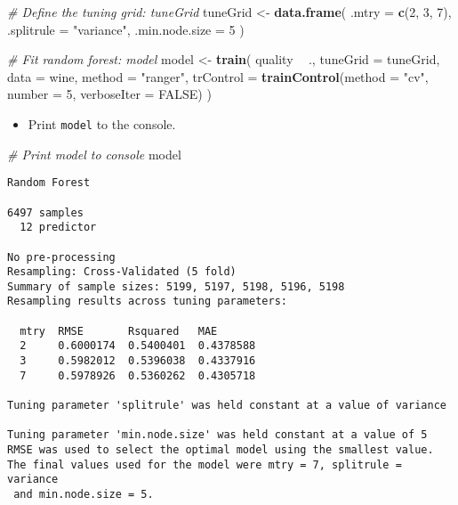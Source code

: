 \documentclass[
]{book}
\newenvironment{Shaded}{\begin{snugshade}}{\end{snugshade}}
\newcommand{\CommentTok}[1]{\textcolor[rgb]{0.56,0.35,0.01}{\textit{#1}}}
\newcommand{\DataTypeTok}[1]{\textcolor[rgb]{0.13,0.29,0.53}{#1}}
\newcommand{\DecValTok}[1]{\textcolor[rgb]{0.00,0.00,0.81}{#1}}
\newcommand{\KeywordTok}[1]{\textcolor[rgb]{0.13,0.29,0.53}{\textbf{#1}}}
\newcommand{\NormalTok}[1]{#1}
\newcommand{\OperatorTok}[1]{\textcolor[rgb]{0.81,0.36,0.00}{\textbf{#1}}}
\newcommand{\OtherTok}[1]{\textcolor[rgb]{0.56,0.35,0.01}{#1}}
\newcommand{\StringTok}[1]{\textcolor[rgb]{0.31,0.60,0.02}{#1}}
\providecommand{\tightlist}{%
  \setlength{\itemsep}{0pt}\setlength{\parskip}{0pt}}
\begin{document}
\begin{Shaded}
\begin{Highlighting}[]
\CommentTok{# Define the tuning grid: tuneGrid}
\NormalTok{tuneGrid <-}\StringTok{ }\KeywordTok{data.frame}\NormalTok{(}
  \DataTypeTok{.mtry =} \KeywordTok{c}\NormalTok{(}\DecValTok{2}\NormalTok{, }\DecValTok{3}\NormalTok{, }\DecValTok{7}\NormalTok{),}
  \DataTypeTok{.splitrule =} \StringTok{"variance"}\NormalTok{,}
  \DataTypeTok{.min.node.size =} \DecValTok{5}
\NormalTok{)}

\CommentTok{# Fit random forest: model}
\NormalTok{model <-}\StringTok{ }\KeywordTok{train}\NormalTok{(}
\NormalTok{  quality }\OperatorTok{~}\StringTok{ }\NormalTok{.,}
  \DataTypeTok{tuneGrid =}\NormalTok{ tuneGrid,}
  \DataTypeTok{data =}\NormalTok{ wine, }
  \DataTypeTok{method =} \StringTok{"ranger"}\NormalTok{,}
  \DataTypeTok{trControl =} \KeywordTok{trainControl}\NormalTok{(}\DataTypeTok{method =} \StringTok{"cv"}\NormalTok{, }
                           \DataTypeTok{number =} \DecValTok{5}\NormalTok{, }
                           \DataTypeTok{verboseIter =} \OtherTok{FALSE}\NormalTok{)}
\NormalTok{)}
\end{Highlighting}
\end{Shaded}

\begin{itemize}
\tightlist
\item
  Print \texttt{model} to the console.
\end{itemize}

\begin{Shaded}
\begin{Highlighting}[]
\CommentTok{# Print model to console}
\NormalTok{model}
\end{Highlighting}
\end{Shaded}

\begin{verbatim}
Random Forest 

6497 samples
  12 predictor

No pre-processing
Resampling: Cross-Validated (5 fold) 
Summary of sample sizes: 5199, 5197, 5198, 5196, 5198 
Resampling results across tuning parameters:

  mtry  RMSE       Rsquared   MAE      
  2     0.6000174  0.5400401  0.4378588
  3     0.5982012  0.5396038  0.4337916
  7     0.5978926  0.5360262  0.4305718

Tuning parameter 'splitrule' was held constant at a value of variance

Tuning parameter 'min.node.size' was held constant at a value of 5
RMSE was used to select the optimal model using the smallest value.
The final values used for the model were mtry = 7, splitrule = variance
 and min.node.size = 5.
\end{verbatim}
\end{document}
